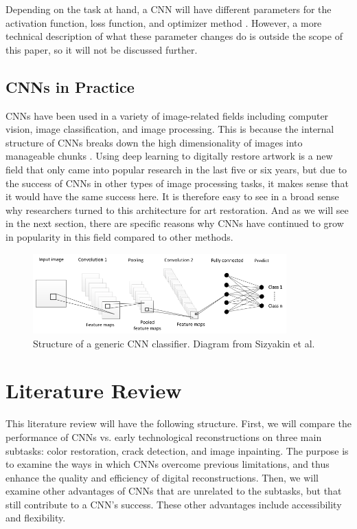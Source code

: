 \documentclass[a4paper,11pt]{article}
\begin{document}
Depending on the task at hand, a CNN will have different parameters for the activation function, loss function, and optimizer method \cite{mol}\cite{sizyakin}. However, a more technical description of what these parameter changes do is outside the scope of this paper, so it will not be discussed further. 

\subsection{CNNs in Practice}

CNNs have been used in a variety of image-related fields including computer vision, image classification, and image processing. This is because the internal structure of CNNs breaks down the high dimensionality of images into manageable chunks \cite{sizyakin}. Using deep learning to digitally restore artwork is a new field that only came into popular research in the last five or six years, but due to the success of CNNs in other types of image processing tasks, it makes sense that it would have the same success here. It is therefore easy to see in a broad sense why researchers turned to this architecture for art restoration. And as we will see in the next section, there are specific reasons why CNNs have continued to grow in popularity in this field compared to other methods. 

\begin{figure}[h]
    \centering
    \includegraphics[width=0.87\textwidth]{cnn.png}
    \caption{Structure of a generic CNN classifier. Diagram from Sizyakin et al. \cite{sizyakin}}
\end{figure}
 
\section{Literature Review}

This literature review will have the following structure.  First, we will compare the performance of CNNs vs. early technological reconstructions on three main subtasks: color restoration, crack detection, and image inpainting. The purpose is to examine the ways in which CNNs overcome previous limitations, and thus enhance the quality and efficiency of digital reconstructions. Then, we will examine other advantages of CNNs that are unrelated to the subtasks, but that still contribute to a CNN’s success. These other advantages include accessibility and flexibility. 
 
\end{document}
